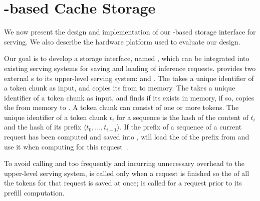\section{\cxl-based \kv Cache Storage}
\label{sec:implementation}


We now present the design and implementation of our \cxl-based \kvcache storage interface for \llm serving. We also describe the hardware platform used to evaluate our design.

 Our goal is to develop a \cxl storage interface, named \tool, which can be integrated into existing \llm serving systems for saving and loading \kvcache of inference requests.
\tool provides two external \api{}s to its upper-level serving system: \apisave and \apiload. 
The \apisave takes a unique identifier of a token chunk as input, and copies its \kvcache from \gpu to \cxl memory. 
The \apiload takes a unique identifier of a token chunk as input, and finds if its  \kvcache exists in \cxl memory, if so, copies the \kvcache from \cxl memory to \gpu. A token chunk can consist of one or more tokens.
The unique identifier of a token chunk $t_i$ for a sequence is the hash of the content of $t_i$ and the hash of its prefix $\langle t_0,...,t_{i-1}\rangle$. If the prefix of a sequence of a current request has been computed and saved into \cxl, \tool will load the \kvcache of the prefix from \cxl and use it when computing for this request~\cite{pagedattenion}. 

To avoid calling \apisave and \apiload too frequently and incurring unnecessary overhead to the upper-level serving system, \apisave is called only when a request is finished so the \kvcache of all the tokens for that request is saved at once; \apiload is called for a request prior to its prefill computation. 

